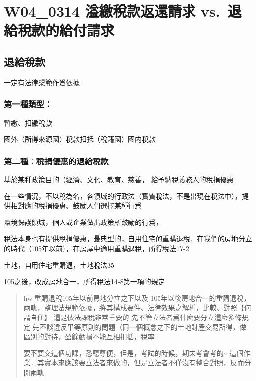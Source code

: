 \documentclass[]{ctexbook}
\begin{document}
\hypertarget{w04_0314-ux6ea2ux7e73ux7a05ux6b3eux8fd4ux9084ux8acbux6c42-vs.-ux9000ux7d66ux7a05ux6b3eux7684ux7d66ux4ed8ux8acbux6c42}{%
\chapter{W04\_0314 溢繳稅款返還請求 vs.~退給稅款的給付請求}\label{w04_0314-ux6ea2ux7e73ux7a05ux6b3eux8fd4ux9084ux8acbux6c42-vs.-ux9000ux7d66ux7a05ux6b3eux7684ux7d66ux4ed8ux8acbux6c42}}

\hypertarget{ux9000ux7d66ux7a05ux6b3e}{%
\section{退給稅款}\label{ux9000ux7d66ux7a05ux6b3e}}

一定有法律槼範作爲依據

\hypertarget{ux7b2cux4e00ux7a2eux985eux578b}{%
\subsection{第一種類型：}\label{ux7b2cux4e00ux7a2eux985eux578b}}

暫繳、扣繳稅款

國外（所得來源國）稅款扣抵（稅籍國）國内稅款

\hypertarget{ux7b2cux4e8cux7a2eux7a05ux6350ux512aux60e0ux7684ux9000ux7d66ux7a05ux6b3e}{%
\subsection{第二種：稅捐優惠的退給稅款}\label{ux7b2cux4e8cux7a2eux7a05ux6350ux512aux60e0ux7684ux9000ux7d66ux7a05ux6b3e}}

基於某種政策目的（經濟、文化、教育、慈善，
給予納稅義務人的稅捐優惠

在一些情況，不以稅為名，各領域的行政法（實質稅法，不是出現在稅法中），提供相對應的稅捐優惠、鼓勵人們選擇某種行爲

環境保護領域，個人或企業做出政策所鼓勵的行爲，

稅法本身也有提供稅捐優惠，最典型的，自用住宅的重購退稅，在我們的房地分立的時代（105年以前），在房屋中適用重購退稅，所得稅法17-2

土地，自用住宅重購退，土地稅法35

105之後，改成房地合一，所得稅法14-8第一項的規定

\begin{quote}
hw 重購退稅105年以前房地分立之下以及 105年以後房地合一的重購退稅，兩軌，整理法規範依據，將其構成要件、法律效果之解析，比較、對照【何謂自住】
這是依法課稅非常重要的
先不管立法者爲什麽要分立這麽多條規定
先不談違反平等原則的問題（同一個概念之下的土地財產交易所得，做區別的對待，盈餘虧損不能互相扣抵，稅率

要不要交這個功課，悉聽尊便，但是，考試的時候，期末考會考的\textasciitilde{}
這個作業，其實本來應該要立法者來做的，但是立法者不僅沒有整合對照，反而分開兩軌
\end{quote}
\end{document}
